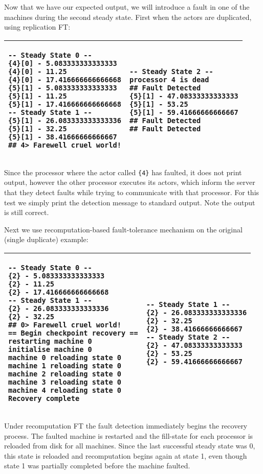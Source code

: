 Now that we have our expected output, we will introduce a fault in one of the machines during the second steady state.
First when the actors are duplicated, using replication FT:
\begin{center}
\begin{tabular}{ | p{5cm} p{5cm} | }
	\hline
	\begin{verbatim}
-- Steady State 0 --
{4}[0] - 5.083333333333333
{4}[0] - 11.25
{4}[0] - 17.416666666666668
{5}[1] - 5.083333333333333
{5}[1] - 11.25
{5}[1] - 17.416666666666668
-- Steady State 1 --
{5}[1] - 26.083333333333336
{5}[1] - 32.25
{5}[1] - 38.41666666666667
## 4> Farewell cruel world!
	\end{verbatim}
	&
	\begin{verbatim}
-- Steady State 2 --
processor 4 is dead
## Fault Detected
{5}[1] - 47.08333333333333
{5}[1] - 53.25
{5}[1] - 59.41666666666667
## Fault Detected
## Fault Detected
	\end{verbatim}
	\\ \hline
\end{tabular}
\end{center}
\noindent Since the processor where the actor called \verb={4}= has faulted, it does not print output, however the other processor executes its actors, which inform the server that they detect faults while trying to communicate with that processor.
For this test we simply print the detection message to standard output.
Note the output is still correct.

Next we use recomputation-based fault-tolerance mechanism on the original (single duplicate) example:
\begin{center}
\begin{tabular}{ | p{5cm} p{5cm} | }
	\hline
	\begin{verbatim}
-- Steady State 0 --
{2} - 5.083333333333333
{2} - 11.25
{2} - 17.416666666666668
-- Steady State 1 --
{2} - 26.083333333333336
{2} - 32.25
## 0> Farewell cruel world!
== Begin checkpoint recovery ==
restarting machine 0
initialise machine 0
machine 0 reloading state 0
machine 1 reloading state 0
machine 2 reloading state 0
machine 3 reloading state 0
machine 4 reloading state 0
Recovery complete
	\end{verbatim}
	&
	\begin{verbatim}
-- Steady State 1 --
{2} - 26.083333333333336
{2} - 32.25
{2} - 38.41666666666667
-- Steady State 2 --
{2} - 47.08333333333333
{2} - 53.25
{2} - 59.41666666666667
	\end{verbatim}
	\\ \hline
\end{tabular}
\end{center}
\noindent Under recomputation FT the fault detection immediately begins the recovery process.
The faulted machine is restarted and the fill-state for each processor is reloaded from disk for all machines.
Since the last successful steady state was 0, this state is reloaded and recomputation begins again at state 1, even though state 1 was partially completed before the machine faulted.

